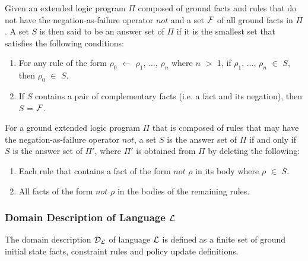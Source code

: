 \documentclass[global,twocolumn,final]{svjour}
\newenvironment{vdefinition}
  {\begin{definition}\hspace{0.25em}}
  {\end{definition}}
\begin{document}
      \begin{vdefinition}
        \label{def-ans}
        Given an extended logic program $\Pi$ composed of ground facts and
        rules that do not have the negation-as-failure operator $not$ and a set
        ${\cal F}$ of all ground facts in $\Pi$. A set $S$ is then said to be
        an answer set of $\Pi$ if it is the smallest set that satisfies the
        following conditions:

        \begin{enumerate}
          \item
            For any rule of the form $\rho_{0}$ $\leftarrow$ $\rho_{1}$,
            $\hdots$, $\rho_{n}$ where $n$ $>$ 1, if $\rho_{1}$, $\hdots$,
            $\rho_{n}$ $\in$ $S$, then
            $\rho_{0}$ $\in$ $S$.
          \item
            If $S$ contains a pair of complementary facts (i.e. a fact and
            its negation), then $S$ = ${\cal F}$.
        \end{enumerate}

        For a ground extended logic program $\Pi$ that is composed of rules
        that may have the negation-as-failure operator $not$, a set $S$ is the
        answer set of $\Pi$ if and only if $S$ is the answer set of $\Pi'$,
        where $\Pi'$ is obtained from $\Pi$ by deleting the following:

        \begin{enumerate}
          \item
            Each rule that contains a fact of the form $not$ $\rho$ in its body
            where $\rho$ $\in$ $S$.
          \item
            All facts of the form $not$ $\rho$ in the bodies of the remaining
            rules.
        \end{enumerate}
      \end{vdefinition}

      \subsubsection{Domain Description of Language ${\cal L}$}
        \begin{vdefinition}
          \label{def-domain}
          The domain description ${\cal D}_{\cal L}$ of language ${\cal L}$ is
          defined as a finite set of ground initial state facts, constraint
          rules and policy update definitions.
        \end{vdefinition}
\end{document}
